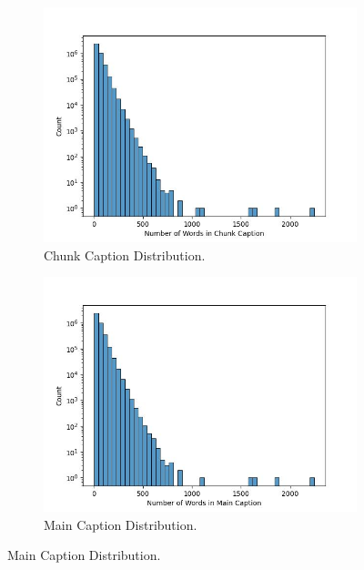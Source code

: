 
\begin{figure}[tp]
  \centering

  \begin{subfigure}{0.45\textwidth}
    \centering
    \includegraphics[width=\textwidth]{figs/data-statistic/caption_lens_all.jpg}
    \caption{Chunk Caption Distribution.}
    \label{fig:subfig1}
  \end{subfigure}
  \hfill
  \begin{subfigure}{0.45\textwidth}
    \centering
    \includegraphics[width=\textwidth]{figs/data-statistic/caption_lens.jpg}
    \caption{Main Caption Distribution.}
    \label{fig:subfig2}
  \end{subfigure}

\end{figure}
